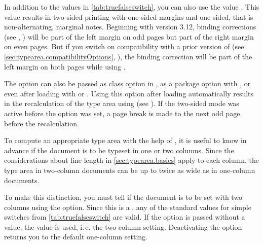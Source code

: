 In addition to the values in \autoref{tab:truefalseswitch}, you can also use
the value . This value
results in two-sided printing with one-sided margins and one-sided, that is
non-alternating, marginal notes.
Beginning with \KOMAScript{} version
3.12, binding corrections (see ,
) will be part of the left margin on odd
pages but part of the right margin on even pages. But if you switch on
compatibility with a prior
version of \KOMAScript{}
(see \autoref{sec:typearea.compatibilityOptions},
), the binding correction will
be part of the left margin on both pages while using
.

The option can also be passed as class option in
, as a package option with
, or even after loading
 with  or
. Using this option after loading
 automatically results in
the recalculation of the type area using 
 (see
). If the two-sided mode was active
before the option was set, a page break is made to the next odd page before
the recalculation.%
%
\EndIndexGroup


\begin{Declaration}
\end{Declaration}
To compute an appropriate type area with the help of
, it is useful to know in advance if the
document is to be typeset in one or two columns. Since the considerations
about line length in \autoref{sec:typearea.basics} apply to each column, the
type area in two-column documents can be up to twice as wide as in one-column
documents.

To make this distinction, you must tell  if the document is
to be set with two columns using the  option. Since this is
a , any of the standard values for simple switches
from \autoref{tab:truefalseswitch} are valid. If the option is passed without
a value, the value  is
used, i.\,e. the two-column setting. Deactivating the option returns you to
the default one-column setting.

